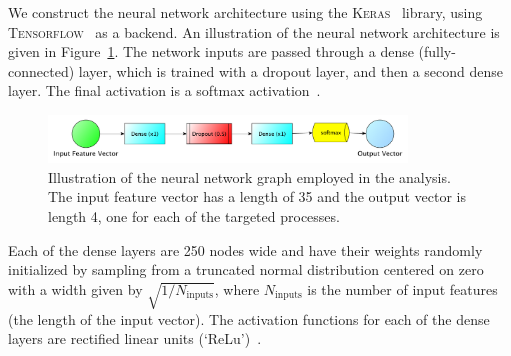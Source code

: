 We construct the neural network architecture using the \textsc{Keras}~\cite{chollet2015keras}
library, using \textsc{Tensorflow}~\cite{tensorflow2015} as a backend.
An illustration of the neural network architecture is given in Figure~\ref{fig:nn_arch}.
The network inputs are passed through a dense (fully-connected) layer,  which
is trained with a dropout layer, and then a second dense layer.
The final activation is a softmax activation~\cite{GoodFellowBook}.

\begin{figure}[!htb]
    \begin{center}
        \includegraphics[width=0.85\textwidth]{figures/search_hh/mva/nn_arch_graph_updated}
        \caption{
            Illustration of the neural network graph employed in the analysis.
            The input feature vector has a length of 35 and the output vector is length 4,
            one for each of the targeted processes.
        }
        \label{fig:nn_arch}
    \end{center}
\end{figure}
Each of the dense layers are 250 nodes wide and  have their weights randomly initialized by sampling
from a truncated normal distribution centered on zero with a width given by $\sqrt{1/N_{\text{inputs}}}$, where
$N_{\text{inputs}}$ is the number of input features (the length of the input vector).
The activation functions for each of the dense layers are rectified linear units (`ReLu')~\cite{ReLu}.

